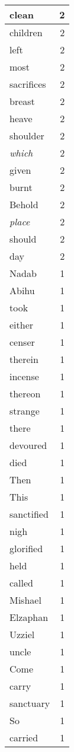 \begin{center}
\begin{longtable}{l|r}
clean & 2 \\ \hline
children & 2 \\ \hline
left & 2 \\ \hline
most & 2 \\ \hline
sacrifices & 2 \\ \hline
breast & 2 \\ \hline
heave & 2 \\ \hline
shoulder & 2 \\ \hline
\emph{which} & 2 \\ \hline
given & 2 \\ \hline
burnt & 2 \\ \hline
Behold & 2 \\ \hline
\emph{place} & 2 \\ \hline
should & 2 \\ \hline
day & 2 \\ \hline
Nadab & 1 \\ \hline
Abihu & 1 \\ \hline
took & 1 \\ \hline
either & 1 \\ \hline
censer & 1 \\ \hline
therein & 1 \\ \hline
incense & 1 \\ \hline
thereon & 1 \\ \hline
strange & 1 \\ \hline
there & 1 \\ \hline
devoured & 1 \\ \hline
died & 1 \\ \hline
Then & 1 \\ \hline
This & 1 \\ \hline
sanctified & 1 \\ \hline
nigh & 1 \\ \hline
glorified & 1 \\ \hline
held & 1 \\ \hline
called & 1 \\ \hline
Mishael & 1 \\ \hline
Elzaphan & 1 \\ \hline
Uzziel & 1 \\ \hline
uncle & 1 \\ \hline
Come & 1 \\ \hline
carry & 1 \\ \hline
sanctuary & 1 \\ \hline
So & 1 \\ \hline
carried & 1 \\ \hline

\end{longtable}
\end{center}
